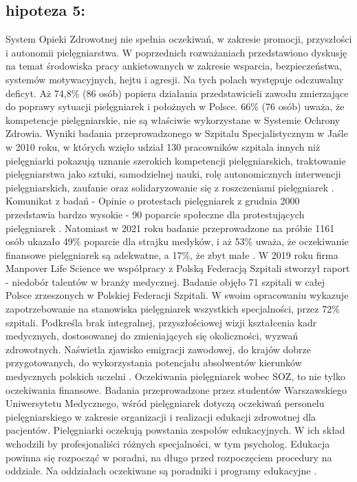 \documentclass[a4paper,12pt,twoside,openany]{report}
\begin{document}
\subsection*{hipoteza 5:} 
System Opieki Zdrowotnej nie spełnia oczekiwań, w zakresie promocji, przyszłości i autonomii pielęgniarstwa. W poprzednich rozważaniach przedstawiono dyskusję  na temat środowiska pracy ankietowanych w zakresie wsparcia, bezpieczeństwa, systemów motywacyjnych, hejtu  i agresji. Na tych polach występuje odczuwalny deficyt. Aż 74,8\%  (86 osób) popiera działania przedstawicieli zawodu zmierzające do poprawy sytuacji pielęgniarek i położnych w Polsce.  66\% (76 osób) uważa, że kompetencje pielęgniarskie, nie są właściwie wykorzystane w Systemie Ochrony Zdrowia. Wyniki badania przeprowadzonego w Szpitalu Specjalistycznym w Jaśle w 2010 roku, w których wzięło udział 130 pracowników szpitala innych niż pielęgniarki pokazują uznanie szerokich kompetencji pielęgniarskich, traktowanie pielęgniarstwa jako sztuki, samodzielnej nauki, rolę autonomicznych interwencji pielęgniarskich, zaufanie oraz solidaryzowanie się z roszczeniami pielęgniarek \cite{skorupska}. Komunikat z badań - Opinie o protestach pielęgniarek z grudnia 2000 przedstawia bardzo wysokie - 90  poparcie  społeczne dla protestujących pielęgniarek \cite{cebos}. Natomiast w 2021 roku badanie przeprowadzone na próbie 1161 osób ukazało 49\% poparcie dla strajku medyków, i aż 53\% uważa, że oczekiwanie finansowe pielęgniarek są adekwatne, a 17\%, że zbyt małe \cite{cebos2}. W 2019 roku firma Manpover Life Science we współpracy z Polską Federacją Szpitali stworzył raport - niedobór talentów w branży medycznej. Badanie objęło 71 szpitali w całej Polsce zrzeszonych w Polskiej Federacji Szpitali. W swoim opracowaniu wykazuje zapotrzebowanie na stanowiska pielęgniarek wszystkich specjalności, przez 72\% szpitali. Podkreśla brak integralnej, przyszłościowej wizji kształcenia kadr medycznych, dostosowanej do zmieniających się okoliczności, wyzwań zdrowotnych. Naświetla zjawisko emigracji zawodowej,  do krajów dobrze przygotowanych, do wykorzystania potencjału absolwentów kierunków medycznych polskich uczelni \cite{federacja}.
Oczekiwania pielęgniarek wobec SOZ, to nie tylko oczekiwania finansowe. Badania przeprowadzone przez studentów Warszawskiego Uniwersytetu Medycznego, wśród pielęgniarek dotyczą oczekiwań personelu pielęgniarskiego w zakresie organizacji i realizacji edukacji zdrowotnej dla pacjentów. Pielęgniarki oczekują powstania zespołów edukacyjnych. W ich skład wchodzili by profesjonaliści różnych specjalności, w tym psycholog. Edukacja powinna się rozpocząć w poradni, na długo przed rozpoczęciem procedury na oddziale. Na oddziałach oczekiwane są poradniki i programy edukacyjne \cite{soz}.
\end{document}

